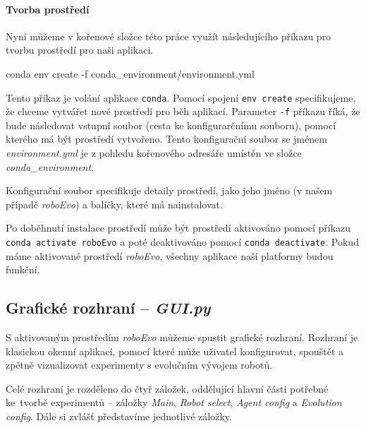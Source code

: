 \paragraph{Tvorba prostředí}
Nyní můžeme v kořenové složce této práce využít následujícího příkazu pro
tvorbu prostředí pro naši aplikaci.
\begin{code}
conda env create -f conda_environment/environment.yml
\end{code}
Tento příkaz je volání aplikace \texttt{conda}. Pomocí spojení \texttt{env
create} specifikujeme, že chceme vytvářet nové prostředí pro běh aplikací.
Parameter \texttt{-f} příkazu říká, že bude následovat vstupní soubor (cesta ke
konfigurarčnímu souboru), pomocí kterého má být prostředí vytvořeno. Tento
konfigurační soubor se jménem \emph{environment.yml} je z pohledu kořenového
adresáře umístěn ve složce \emph{conda\_environment}.

Konfigurační soubor specifikuje detaily prostředí, jako jeho jméno (v našem
případě \emph{roboEvo}) a balíčky, které má nainstalovat.

Po doběhnutí instalace prostředí může být prostředí aktivováno pomocí příkazu
\texttt{conda activate roboEvo} a poté deaktivováno pomocí \texttt{conda
deactivate}. Pokud máme aktivované prostředí \emph{roboEvo}, všechny aplikace
naší platformy budou funkční.

\subsection{Grafické rozhraní -- \emph{GUI.py}} \label{doc_12_GUI}

S aktivovaným prostředím \emph{roboEvo} můžeme spustit grafické rozhraní.
Rozhraní je klasickou okenní aplikací, pomocí které může uživatel konfigurovat,
spouštět a zpětně vizualizovat experimenty s evolučním vývojem robotů.

Celé rozhraní je rozděleno do čtyř záložek, oddělující hlavní části potřebné
ke~tvorbě experimentů -- záložky \emph{Main}, \emph{Robot select}, \emph{Agent
config} a \emph{Evolution config}. Dále si zvlášť představíme jednotlivé
záložky.

